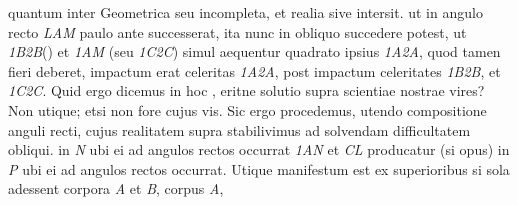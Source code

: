 % 
%
quantum inter Geometrica seu incompleta,%
\protect{} 
%
et realia sive %
\protect{} intersit. 
%
%
ut in angulo recto%
\protect{} \textit{LAM} paulo ante successerat, ita
%
nunc in obliquo%
\protect{} succedere potest, ut %
% 
%
\textit{{\scriptsize1}B{\scriptsize2}B}\phantom(\hspace*{-1.2mm}) et \textit{{\scriptsize1}AM} 
%
(seu \textit{{\scriptsize1}C{\scriptsize2}C}) simul aequentur quadrato ipsius
%
\textit{{\scriptsize1}A{\scriptsize2}A}, quod tamen fieri deberet, %
% 
%
impactum erat celeritas \textit{{\scriptsize1}A{\scriptsize2}A}, post impactum 
%
celeritates \textit{{\scriptsize1}B{\scriptsize2}B}, et \textit{{\scriptsize1}C{\scriptsize2}C}. Quid ergo dicemus in hoc %
% 
,
%
eritne solutio supra scientiae nostrae vires? Non utique; etsi %
% 
%
non fore cujus vis. Sic ergo procedemus, utendo compositione anguli recti, 
%
cujus realitatem\protect{} supra stabilivimus %
ad solvendam difficultatem obliqui. %
% 
%
in \textit{N} ubi ei ad angulos rectos occurrat \textit{{\scriptsize1}AN} et \textit{CL} producatur (si opus) in \textit{P} 
%
ubi ei ad angulos rectos occurrat. Utique manifestum est ex superioribus 
%
si sola adessent corpora \textit{A} et \textit{B}, corpus \textit{A}, %
